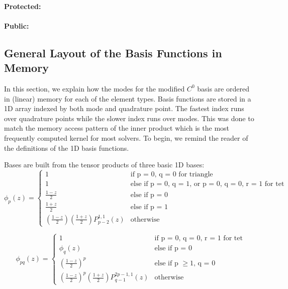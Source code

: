 \paragraph{Protected:}

\paragraph{Public:}


\subsection{General Layout of the Basis Functions in Memory}

In this section, we explain how the modes for the modified $C^0$ basis are ordered in (linear) memory for each of the element types.  
Basis functions are stored in a 1D array indexed by both mode and quadrature point. The fastest index runs over quadrature points while the 
slower index runs over modes. 
This was done to match the memory access pattern of the inner product which is the most frequently computed kernel for most solvers.
To begin, we remind the reader of the definitions of the 1D basis functions.

Bases are built from the tensor products of three basic 1D bases:\\

\begin{equation}
    \phi_{p}(z) =
    \begin{cases}
        1 & \text{if p = 0, q = 0 for triangle} \\
        1 & \text{else if p = 0, q = 1, or p = 0, q = 0, r = 1 for tet} \\
        \frac{1 - z}{2} & \text{else if p = 0} \\
        \frac{1 + z}{2} & \text{else if p = 1} \\
        \left(\frac{1-z}{2}\right)\left(\frac{1+z}{2}\right) P_{p-2}^{1,1}(z) & \text{otherwise}
    \end{cases}
\end{equation}


\[
    \phi_{pq}(z) = \left\{
    \begin{array}{ll}
        1 & \text{if p = 0, q = 0, r = 1 for tet}\\
        \phi_{q}(z) & \text{else if p = 0} \\
        \left(\frac{1 - z}{2}\right)^p &  \text{else if p $\geq 1$, q = 0} \\
        \left(\frac{1-z}{2}\right)^p \left(\frac{1+z}{2}\right) P_{q-1}^{2p-1,1}(z) & \text{otherwise}
    \end{array}\right.
\]

